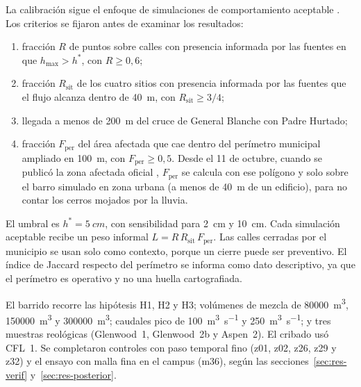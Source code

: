 La calibración sigue el enfoque de simulaciones de comportamiento aceptable \citep{beven1992}. Los criterios se fijaron antes de examinar los resultados:
\begin{enumerate}
\item fracción $R$ de puntos sobre calles con presencia informada por las fuentes en que $h_\mathrm{max}>h^*$, con $R\ge0{,}6$;
\item fracción $R_\mathrm{sit}$ de los cuatro sitios con presencia informada por las fuentes que el flujo alcanza dentro de \SI{40}{m}, con $R_\mathrm{sit}\ge3/4$;
\item llegada a menos de \SI{200}{m} del cruce de General Blanche con Padre Hurtado;
\item fracción $F_\mathrm{per}$ del área afectada que cae dentro del perímetro municipal ampliado en \SI{100}{m}, con $F_\mathrm{per}\ge0{,}5$. Desde el 11 de octubre, cuando se publicó la zona afectada oficial \citep{bbnn2026visor}, $F_\mathrm{per}$ se calcula con ese polígono y solo sobre el barro simulado en zona urbana (a menos de \SI{40}{m} de un edificio), para no contar los cerros mojados por la lluvia.
\end{enumerate}
El umbral es $h^*=\SI{5}{cm}$, con sensibilidad para \SI{2}{cm} y \SI{10}{cm}. Cada simulación aceptable recibe un peso informal $L=R\,R_\mathrm{sit}\,F_\mathrm{per}$. Las calles cerradas por el municipio se usan solo como contexto, porque un cierre puede ser preventivo. El índice de Jaccard respecto del perímetro se informa como dato descriptivo, ya que el perímetro es operativo y no una huella cartografiada.

El barrido recorre las hipótesis H1, H2 y H3; volúmenes de mezcla de \SI{80000}{\metre\cubed}, \SI{150000}{\metre\cubed} y \SI{300000}{\metre\cubed}; caudales pico de \SI{100}{\metre\cubed\per\second} y \SI{250}{\metre\cubed\per\second}; y tres muestras reológicas (Glenwood~1, Glenwood~2b y Aspen~2). El cribado usó CFL~1. Se completaron controles con paso temporal fino (z01, z02, z26, z29 y z32) y el ensayo con malla fina en el campus (m36), según las secciones~\ref{sec:res-verif} y~\ref{sec:res-posterior}.

